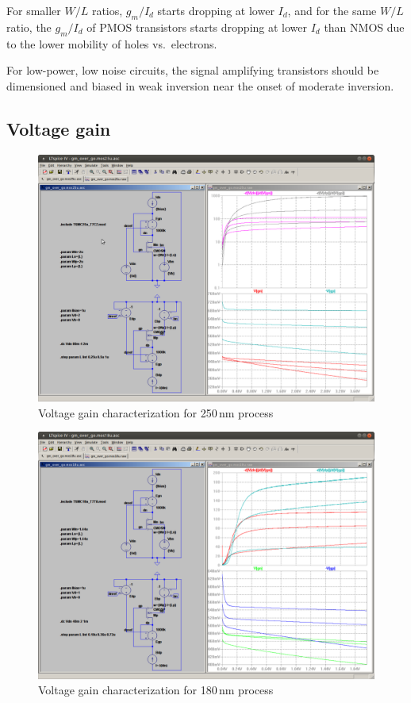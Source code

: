 \documentclass[journal]{IEEEtran}
\begin{document}
For smaller $W/L$ ratios, $g_m/I_d$ starts dropping at lower $I_d$, 
and for the same $W/L$ ratio, the $g_m/I_d$ of PMOS transistors starts dropping at lower $I_d$ than NMOS due to the lower mobility of holes vs.\ electrons.

For low-power, low noise circuits, 
the signal amplifying transistors should be dimensioned and biased in weak inversion
near the onset of moderate inversion. 

\subsection{Voltage gain}
%
\begin{figure}[h]
\centering
\includegraphics[width=1.0\columnwidth]{figures/gm_over_go_mos25u.pdf}
\caption{Voltage gain characterization for 250\,nm process~\cite{gm_go_mos25u}}
\label{fig:gm_go_mos25}
\end{figure}
%
\begin{figure}[h]
\centering
\includegraphics[width=1.0\columnwidth]{figures/gm_over_go_mos18u.pdf}
\caption{Voltage gain characterization for 180\,nm process~\cite{gm_go_mos18u}}
\label{fig:gm_go_mos18}
\end{figure}
%
\end{document}
